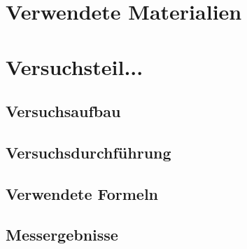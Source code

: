 \documentclass[12pt,a4paper]{article}
\begin{document}
\section{Verwendete Materialien}
\section{Versuchsteil...}
\subsection{Versuchsaufbau}
\subsection{Versuchsdurchführung}
\subsection{Verwendete Formeln}
\subsection{Messergebnisse}
\end{document}
